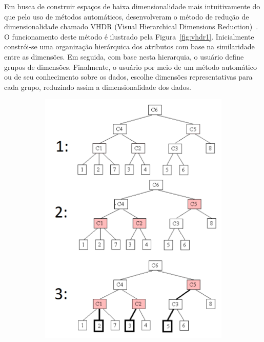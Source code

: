 Em busca de construir espaços de baixa dimensionalidade mais intuitivamente do que pelo uso de métodos automáticos, \citeauthor{Yang2003} desenvolveram o método de redução de dimensionalidade chamado VHDR (Visual Hierarchical Dimensions Reduction)~\cite{Yang2003}. O funcionamento deste método é ilustrado pela Figura~\ref{fig:vhdr1}. Inicialmente constrói-se uma organização hierárquica dos atributos com base na similaridade entre as dimensões. Em seguida, com base nesta hierarquia, o usuário define grupos de dimensões. Finalmente, o usuário por meio de um método automático ou de seu conhecimento sobre os dados, escolhe dimensões representativas para cada grupo, reduzindo assim a dimensionalidade dos dados. 

\begin{figure}[h!]
  \centering
  \begin{subfigure}[b]{0.4\textwidth}
    \centering
    \includegraphics[width=\textwidth]{images/vhdr1.png}
    \caption{}

\end{subfigure}
\end{figure}
